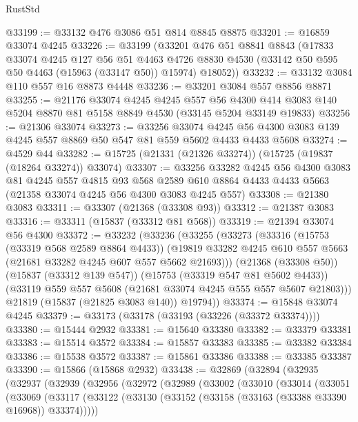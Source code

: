 \begin{lexlean}{RustStd}
\begin{coremodule}
{\begin{coremodule}
{{{{{{{{{{{{{{{{{{{{{{{{{{{{{{{{{{{{{{{{{{{{{{{{{{{{{{{{{{{{@33199 := @33132 @476 @3086 @51 @814 @8845 @8875
@33201 := @16859 @33074 @4245
@33226 := @33199
    (@33201
      @476
      @51
      @8841
      @8843
      (@17833
        @33074
        @4245
        @127
        @56
        @51
        @4463
        @4726
        @8830
        @4530
        (@33142 @50 @595 @50 @4463 (@15963 (@33147 @50)) @15974)
        @18052))
@33232 := @33132 @3084 @110 @557 @16 @8873 @4448
@33236 := @33201 @3084 @557 @8856 @8871
@33255 := @21176
    @33074
    @4245
    @4245
    @557
    @56
    @4300
    @414
    @3083
    @140
    @5204
    @8870
    @81
    @5158
    @8849
    @4530
    (@33145 @5204 @33149 @19833)
@33256 := @21306 @33074
@33273 := @33256
    @33074
    @4245
    @56
    @4300
    @3083
    @139
    @4245
    @557
    @8869
    @50
    @547
    @81
    @559
    @5602
    @4433
    @4433
    @5608
@33274 := @4529 @44
@33282 := @15725 (@21331 (@21326 @33274)) (@15725 (@19837 (@18264 @33274)) @33074)
@33307 := @33256
    @33282
    @4245
    @56
    @4300
    @3083
    @81
    @4245
    @557
    @4815
    @93
    @568
    @2589
    @610
    @8864
    @4433
    @4433
    @5663
    (@21358 @33074 @4245 @56 @4300 @3083 @4245 @557)
@33308 := @21380 @3083
@33311 := @33307 (@21368 (@33308 @93))
@33312 := @21387 @3083
@33316 := @33311 (@15837 (@33312 @81 @568))
@33319 := @21394 @33074 @56 @4300
@33372 := @33232
    (@33236
      (@33255
        (@33273
          (@33316
            (@15753 (@33319 @568 @2589 @8864 @4433))
            (@19819 @33282 @4245 @610 @557 @5663 (@21681 @33282 @4245 @607 @557 @5662 @21693)))
          (@21368 (@33308 @50))
          (@15837 (@33312 @139 @547))
          (@15753 (@33319 @547 @81 @5602 @4433))
          (@33119 @559 @557 @5608 (@21681 @33074 @4245 @555 @557 @5607 @21803)))
        @21819
        (@15837 (@21825 @3083 @140))
        @19794))
@33374 := @15848 @33074 @4245
@33379 := @33173 (@33178 (@33193 (@33226 (@33372 @33374))))
@33380 := @15444 @2932
@33381 := @15640 @33380
@33382 := @33379 @33381
@33383 := @15514 @3572
@33384 := @15857 @33383
@33385 := @33382 @33384
@33386 := @15538 @3572
@33387 := @15861 @33386
@33388 := @33385 @33387
@33390 := @15866 (@15868 @2932)
@33438 := @32869
    (@32894
      (@32935
        (@32937
          (@32939
            (@32956
              (@32972
                (@32989
                  (@33002
                    (@33010
                      (@33014
                        (@33051
                          (@33069
                            (@33117
                              (@33122
                                (@33130 (@33152 (@33158 (@33163 (@33388 @33390 @16968)) @33374)))))
}}}}}}}}}}}}}}}}}}}}}}}}}}}}}}}}}}}}}}}}}}}}}}}}}}}}}}}}}}}}
\end{coremodule}}
\end{coremodule}
\end{lexlean}
